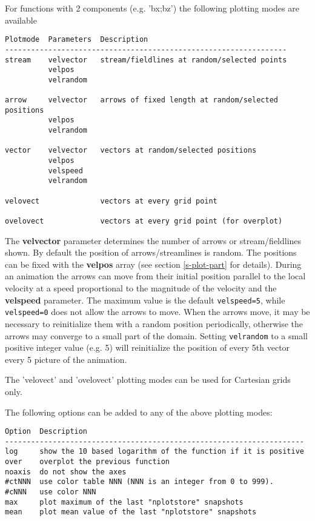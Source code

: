 \documentclass{article}
\begin{document}
For functions with 2 components (e.g. 'bx;bz') the following plotting
modes are available
\begin{verbatim}
Plotmode  Parameters  Description
-----------------------------------------------------------------
stream    velvector   stream/fieldlines at random/selected points
          velpos  
          velrandom

arrow     velvector   arrows of fixed length at random/selected positions
          velpos
          velrandom

vector    velvector   vectors at random/selected positions
          velpos  
          velspeed
          velrandom

velovect              vectors at every grid point

ovelovect             vectors at every grid point (for overplot)
\end{verbatim}
The {\bf velvector} parameter determines the number of arrows or
stream/fieldlines shown. By default the position of arrows/streamlines
is random. The positions can be fixed with the {\bf velpos} array
(see section \ref{s-plot-part} for details). 
During an animation the arrows can move from their initial position
parallel to the local velocity at a speed proportional to the magnitude
of the velocity and the {\bf velspeed} parameter. The maximum value
is the default {\tt velspeed=5}, while {\tt velspeed=0} does not allow
the arrows to move. When the arrows move, it may be necessary to 
reinitialize them with a random position periodically, otherwise the 
arrows may converge to a small part of the domain. Setting {\tt velrandom}
to a small positive integer value (e.g. 5) will reinitialize the
position of every 5th vector every 5 picture of the animation.

The 'velovect' and 'ovelovect' plotting modes 
can be used for Cartesian grids only.

The following options can be added to any of the above plotting modes:
\begin{verbatim}
Option  Description
---------------------------------------------------------------------
log     show the 10 based logarithm of the function if it is positive
over    overplot the previous function
noaxis  do not show the axes
#ctNNN  use color table NNN (NNN is an integer from 0 to 999).
#cNNN   use color NNN
max     plot maximum of the last "nplotstore" snapshots
mean    plot mean value of the last "nplotstore" snapshots
\end{verbatim}
\end{document}
